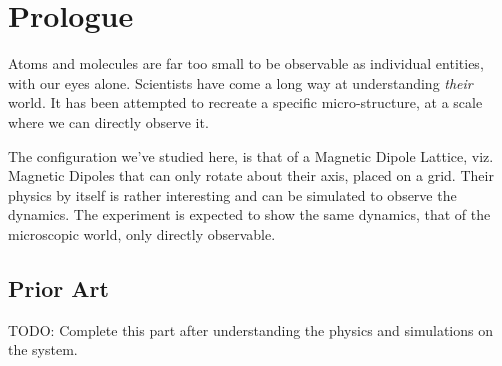 \chapter{Prologue}
Atoms and molecules are far too small to be observable as individual entities, with our eyes alone. Scientists have come a long way at understanding \emph{their} world. It has been attempted to recreate a specific micro-structure, at a scale where we can directly observe it.
\par
The configuration we've studied here, is that of a Magnetic Dipole Lattice, viz. Magnetic Dipoles that can only rotate about their axis, placed on a grid. Their physics by itself is rather interesting and can be simulated to observe the dynamics. The experiment is expected to show the same dynamics, that of the microscopic world, only directly observable.

\section{Prior Art}
TODO: Complete this part after understanding the physics and simulations on the system.